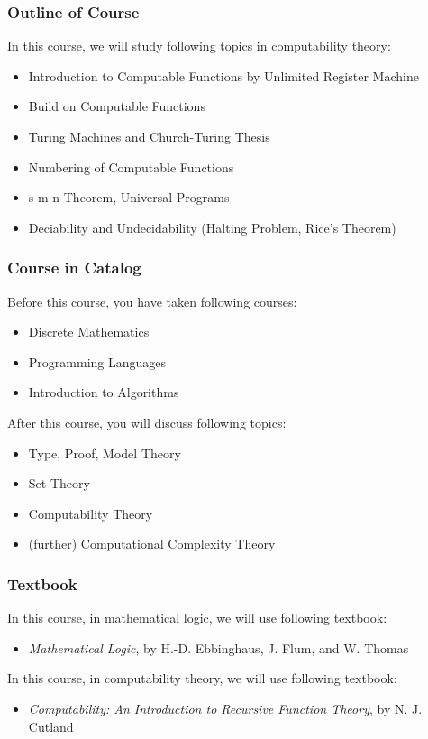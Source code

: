 \begin{frame}
    \frametitle{Outline of Course}
    
    In this course, we will study following topics in computability theory:
    \begin{itemize}
        \item Introduction to Computable Functions by Unlimited Register Machine
        \item Build on Computable Functions
        \item Turing Machines and Church-Turing Thesis
        \item Numbering of Computable Functions
        \item s-m-n Theorem, Universal Programs
        \item Deciability and Undecidability (Halting Problem, Rice's Theorem)
    \end{itemize}
\end{frame}

\begin{frame}
    \frametitle{Course in Catalog}
    
    Before this course, you have taken following courses:
    \begin{itemize}
        \item Discrete Mathematics
        \item Programming Languages
        \item Introduction to Algorithms
    \end{itemize}

    After this course, you will discuss following topics:
    \begin{itemize}
        \item Type, Proof, Model Theory
        \item Set Theory
        \item Computability Theory
        \item (further) Computational Complexity Theory
    \end{itemize}
\end{frame}

\begin{frame}
    \frametitle{Textbook}
    
    In this course, in mathematical logic, we will use following textbook:
    \begin{itemize}
        \item \textit{Mathematical Logic}, by H.-D. Ebbinghaus, J. Flum, and W. Thomas
    \end{itemize}

    In this course, in computability theory, we will use following textbook:
    \begin{itemize}
        \item \textit{Computability: An Introduction to Recursive Function Theory}, by N. J. Cutland
    \end{itemize}
\end{frame}

